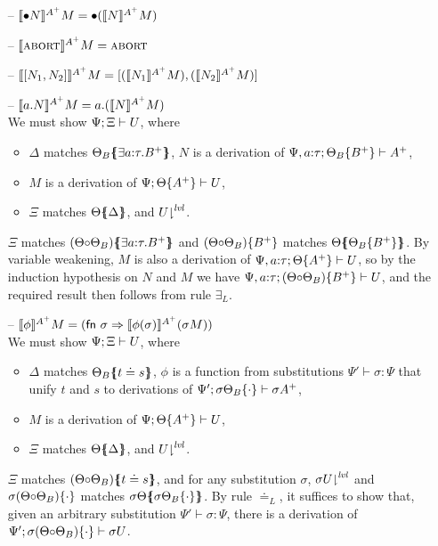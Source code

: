 \begin{itemize}
\item[--] $\lsubsta{\tfusel{N}}{M}{A^+} = \tfusel{(\lsubsta{N}{M}{A^+})}$
\item[--] $\lsubsta{\tabort}{M}{A^+} = \tabort$
\item[--] $\lsubsta{\toplusl{N_1}{N_2}}{M}{A^+} = \toplusl{(\lsubsta{N_1}{M}{A^+})}{(\lsubsta{N_2}{M}{A^+})}$
\item[--] $\lsubsta{\texistsl{a}{N}}{M}{A^+} = \texistsl{a}{(\lsubsta{N}{M}{A^+})}$\smallskip\\
  We must show $\foc{\Psi}{\Xi}{U}$, where
  \begin{itemize}
  \item $\Delta$ matches $\frameoff{\Theta_B}{\exists a{:}\tau.B^+}$, 
     $N$ is a derivation of $\foc{\Psi,a{:}\tau}{\tackon{\Theta_B}{B^+}}{A^+}$,
  \item $M$ is a derivation of $\foc{\Psi}{\tackon{\Theta}{A^+}}{U}$,
  \item $\Xi$ matches $\frameoff{\Theta}{\Delta}$, and
     $\restrictfrom{U}{\mlvl}$.
  \end{itemize}
  $\Xi$ matches $\frameoff{(\Theta{\circ}\Theta_B)}{\exists a{:}\tau.B^+}$
  and $\tackon{(\Theta{\circ}\Theta_B)}{B^+}$ matches 
  $\frameoff{\Theta}{\tackon{\Theta_B}{B^+}}$. By variable weakening,
  $M$ is also a derivation of $\foc{\Psi, a{:}\tau}{\tackon{\Theta}{A^+}}{U}$,
  so by the induction hypothesis on $N$ and $M$ we have
  $\foc{\Psi, a{:}\tau}{\tackon{(\Theta{\circ}\Theta_B)}{B^+}}{U}$, 
  and the required result then follows from rule $\exists_L$. \smallskip

\item[--] $\lsubsta{\phi}{M}{A^+} 
           = (\mathsf{fn}~\sigma \Rightarrow \lsubsta{\phi(\sigma)}{(\sigma{M})}{A^+})$\smallskip\\
  We must show $\foc{\Psi}{\Xi}{U}$, where
  \begin{itemize}
  \item $\Delta$ matches $\frameoff{\Theta_B}{t \doteq s}$,
    $\phi$ is a function from substitutions $\Psi' \vdash \sigma : \Psi$
    that unify $t$ and $s$ to derivations of 
    $\foc{\Psi'}{\tackon{\sigma{\Theta_B}}{\cdot}}{\sigma{A^+}}$,
  \item $M$ is a derivation of $\foc{\Psi}{\tackon{\Theta}{A^+}}{U}$,
  \item $\Xi$ matches $\frameoff{\Theta}{\Delta}$, and 
     $\restrictfrom{U}{\mlvl}$.
  \end{itemize}
  $\Xi$ matches $\frameoff{(\Theta{\circ}\Theta_B)}{t \doteq s}$, and 
  for any substitution $\sigma$, 
  $\restrictfrom{\sigma{U}}{\mlvl}$ and
  $\tackon{\sigma(\Theta{\circ}\Theta_B)}{\cdot}$ matches 
  $\frameoff{\sigma\Theta}{\tackon{\sigma\Theta_B}{\cdot}}$.
  By rule $\doteq_L$, it suffices to show that, 
  given an arbitrary substitution $\Psi' \vdash \sigma : \Psi$, 
  there is a derivation of 
  $\foc{\Psi'}{\tackon{\sigma(\Theta{\circ}\Theta_B)}{\cdot}}{\sigma{U}}$.
  


\end{itemize}
